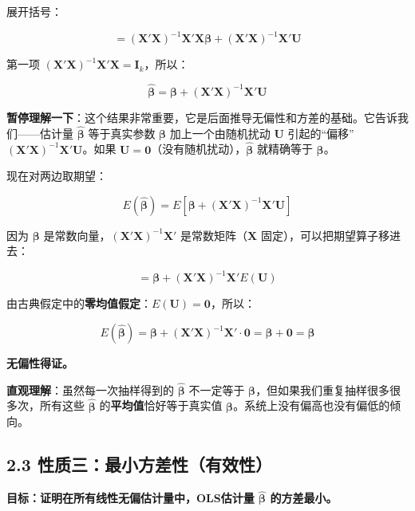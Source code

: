 \documentclass[12pt,a4paper]{ctexart}
\begin{document}
展开括号：

\[
= (\mathbf{X}'\mathbf{X})^{-1}\mathbf{X}'\mathbf{X}\boldsymbol{\beta} + (\mathbf{X}'\mathbf{X})^{-1}\mathbf{X}'\mathbf{U}
\]

第一项 $(\mathbf{X}'\mathbf{X})^{-1}\mathbf{X}'\mathbf{X} = \mathbf{I}_k$，所以：

\begin{equation}
\hat{\boldsymbol{\beta}} = \boldsymbol{\beta} + (\mathbf{X}'\mathbf{X})^{-1}\mathbf{X}'\mathbf{U} \tag{3.29}
\end{equation}

\textbf{暂停理解一下}：这个结果非常重要，它是后面推导无偏性和方差的基础。它告诉我们——估计量 $\hat{\boldsymbol{\beta}}$ 等于真实参数 $\boldsymbol{\beta}$ 加上一个由随机扰动 $\mathbf{U}$ 引起的“偏移” $(\mathbf{X}'\mathbf{X})^{-1}\mathbf{X}'\mathbf{U}$。如果 $\mathbf{U} = \mathbf{0}$（没有随机扰动），$\hat{\boldsymbol{\beta}}$ 就精确等于 $\boldsymbol{\beta}$。

现在对两边取期望：

\[
E(\hat{\boldsymbol{\beta}}) = E[\boldsymbol{\beta} + (\mathbf{X}'\mathbf{X})^{-1}\mathbf{X}'\mathbf{U}]
\]

因为 $\boldsymbol{\beta}$ 是常数向量，$(\mathbf{X}'\mathbf{X})^{-1}\mathbf{X}'$ 是常数矩阵（$\mathbf{X}$ 固定），可以把期望算子移进去：

\[
= \boldsymbol{\beta} + (\mathbf{X}'\mathbf{X})^{-1}\mathbf{X}' E(\mathbf{U})
\]

由古典假定中的\textbf{零均值假定}：$E(\mathbf{U}) = \mathbf{0}$，所以：

\begin{equation}
E(\hat{\boldsymbol{\beta}}) = \boldsymbol{\beta} + (\mathbf{X}'\mathbf{X})^{-1}\mathbf{X}' \cdot \mathbf{0} = \boldsymbol{\beta} + \mathbf{0} = \boldsymbol{\beta} \tag{3.30}
\end{equation}

\textbf{无偏性得证。}

\textbf{直观理解}：虽然每一次抽样得到的 $\hat{\boldsymbol{\beta}}$ 不一定等于 $\boldsymbol{\beta}$，但如果我们重复抽样很多很多次，所有这些 $\hat{\boldsymbol{\beta}}$ 的\textbf{平均值}恰好等于真实值 $\boldsymbol{\beta}$。系统上没有偏高也没有偏低的倾向。

\subsection{2.3 性质三：最小方差性（有效性）}

\textbf{目标：证明在所有线性无偏估计量中，OLS估计量 $\hat{\boldsymbol{\beta}}$ 的方差最小。}
\end{document}
